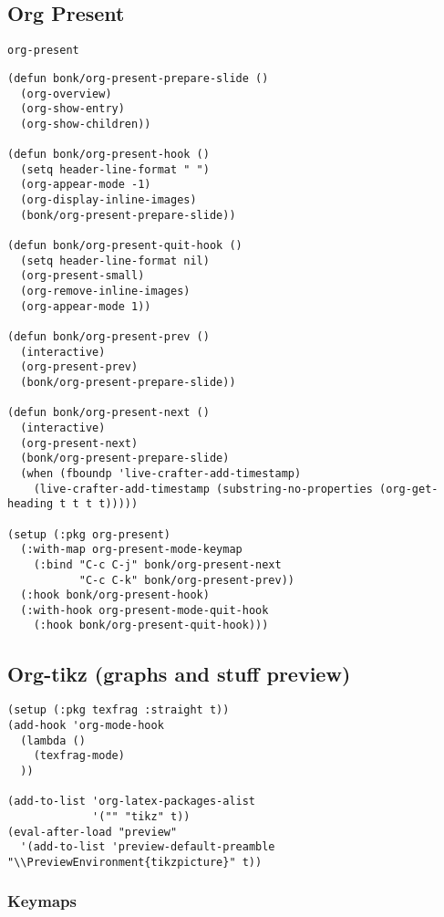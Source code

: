 \documentclass[11pt]{article}
\begin{document}
\subsection{Org Present}
\label{sec:orgc80f022}
\texttt{org-present}
\begin{verbatim}
(defun bonk/org-present-prepare-slide ()
  (org-overview)
  (org-show-entry)
  (org-show-children))

(defun bonk/org-present-hook ()
  (setq header-line-format " ")
  (org-appear-mode -1)
  (org-display-inline-images)
  (bonk/org-present-prepare-slide))

(defun bonk/org-present-quit-hook ()
  (setq header-line-format nil)
  (org-present-small)
  (org-remove-inline-images)
  (org-appear-mode 1))

(defun bonk/org-present-prev ()
  (interactive)
  (org-present-prev)
  (bonk/org-present-prepare-slide))

(defun bonk/org-present-next ()
  (interactive)
  (org-present-next)
  (bonk/org-present-prepare-slide)
  (when (fboundp 'live-crafter-add-timestamp)
    (live-crafter-add-timestamp (substring-no-properties (org-get-heading t t t t)))))

(setup (:pkg org-present)
  (:with-map org-present-mode-keymap
    (:bind "C-c C-j" bonk/org-present-next
           "C-c C-k" bonk/org-present-prev))
  (:hook bonk/org-present-hook)
  (:with-hook org-present-mode-quit-hook
    (:hook bonk/org-present-quit-hook)))
\end{verbatim}
\subsection{Org-tikz (graphs and stuff preview)}
\label{sec:org656cf2f}
\begin{verbatim}
(setup (:pkg texfrag :straight t))
(add-hook 'org-mode-hook
  (lambda ()
    (texfrag-mode)
  ))

(add-to-list 'org-latex-packages-alist
             '("" "tikz" t))
(eval-after-load "preview"
  '(add-to-list 'preview-default-preamble "\\PreviewEnvironment{tikzpicture}" t))
\end{verbatim}
\subsubsection{Keymaps}
\label{sec:orgce15be1}
\end{document}
